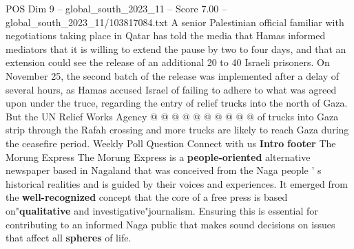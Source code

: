 \begin{textsample}{POS Dim 9 – global\_south\_2023\_11 – Score 7.00 – global\_south\_2023\_11/103817084.txt}
A senior Palestinian official familiar with negotiations taking place in Qatar has told the media that Hamas informed mediators that it is willing to extend the pause by two to four days, and that an extension could see the release of an additional 20 to 40 Israeli prisoners.
On November 25, the second batch of the release was implemented after a delay of several hours, as Hamas accused Israel of failing to adhere to what was agreed upon under the truce, regarding the entry of relief trucks into the north of Gaza.
But the UN Relief Works Agency @ @ @ @ @ @ @ @ @ @ of trucks into Gaza strip through the Rafah crossing and more trucks are likely to reach Gaza during the ceasefire period.
Weekly Poll Question Connect with us \textbf{Intro} \textbf{footer} The Morung Express The Morung Express is a \textbf{people-oriented} alternative newspaper based in Nagaland that was conceived from the Naga people ' s historical realities and is guided by their voices and experiences.
It emerged from the \textbf{well-recognized} concept that the core of a free press is based on"\textbf{qualitative} and investigative"journalism.
Ensuring this is essential for contributing to an informed Naga public that makes sound decisions on issues that affect all \textbf{spheres} of life.

\end{textsample}

